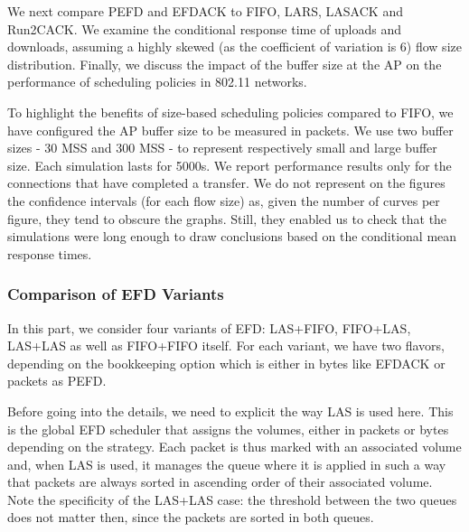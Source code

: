 \documentclass[preprint,12pt]{elsarticle}
\begin{document}
We next compare PEFD and EFDACK to FIFO, LARS, LASACK and Run2CACK.  We examine the conditional response time of uploads and downloads, assuming a highly skewed (as the coefficient of variation is 6) flow size distribution.  Finally, we discuss the impact of the buffer size at the AP on the performance of scheduling policies in 802.11 networks. 

To highlight the benefits of size-based scheduling policies compared to FIFO, we have configured the AP buffer size to be measured in packets. We use two buffer sizes - 30 MSS and 300 MSS - to represent respectively small and large buffer size. Each simulation lasts for 5000s. %
We report performance results only for the connections that have completed a transfer. We do not represent on the figures the confidence intervals  (for each flow size) as, given the number of curves per figure, they tend to obscure the graphs. Still, they enabled us to check that the simulations were long enough to draw conclusions based on the conditional mean response times. 

\subsubsection{Comparison of EFD Variants} \label{section:4schemes}

In this part, we consider four variants of EFD: LAS+FIFO, FIFO+LAS, LAS+LAS as well as FIFO+FIFO itself. For each variant, we have two flavors, depending on the bookkeeping option which is either in bytes like EFDACK or packets as PEFD.%

Before going into the details, we need to explicit the way LAS is used here. This is the global EFD scheduler that assigns the volumes, either in packets or bytes depending on the strategy. Each packet is thus marked with an associated volume and, when LAS is used, it manages the queue where it is applied in such a way that packets are always sorted in ascending order of their associated volume. Note the specificity of the LAS+LAS case: the threshold between the two queues does not matter then, since the packets are sorted in both queues. 
\end{document}
